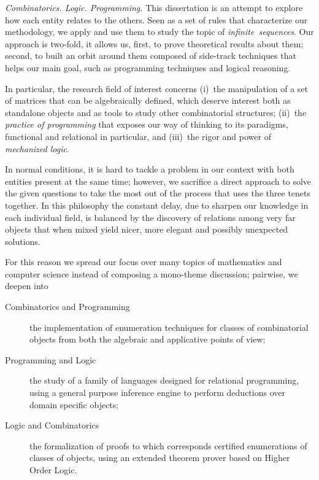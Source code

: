 


\textit{Combinatorics. Logic. Programming.} This dissertation is an attempt to
explore how each entity relates to the others. Seen as a set of rules that
characterize our methodology, we apply and use them to study the topic of
\textit{infinite~sequences}.  Our approach is two-fold, it allows us, first, to
prove theoretical results about them; second, to built an orbit around them
composed of side-track techniques that helps our main goal, such as programming
techniques and logical reasoning.

In particular, the research field of interest concerns (i)~the manipulation of
a set of matrices that can be algebraically defined, which deserve interest
both as standalone objects and as tools to study other combinatorial
structures; (ii)~the \textit{practice of programming} that exposes our way of
thinking to its paradigms, functional and relational in particular, and
(iii)~the rigor and power of \textit{mechanized logic}.

In normal conditions, it is hard to tackle a problem in our context with both
entities present at the same time; however, we sacrifice a direct approach to
solve the given questions to take the most out of the process that uses the
three tenets together. In this philosophy the constant delay, due to sharpen
our knowledge in each individual field, is balanced by the discovery of
relations among very far objects that when mixed yield nicer, more elegant and
possibly unexpected solutions.

For this reason we spread our focus over many topics of mathematics and
computer science instead of composing a mono-theme discussion; pairwise,
we deepen into
\begin{description}

    \item[Combinatorics and Programming] the implementation of enumeration
    techniques for classes of combinatorial objects from both the algebraic
    and applicative points of view;

    \item[Programming and Logic] the study of a family of languages designed
    for relational programming, using a general purpose inference engine to 
    perform deductions over domain specific objects;

    \item[Logic and Combinatorics] the formalization of proofs to which
    corresponds certified enumerations of classes of objects, using an extended
    theorem prover based on Higher Order Logic.

\end{description}

